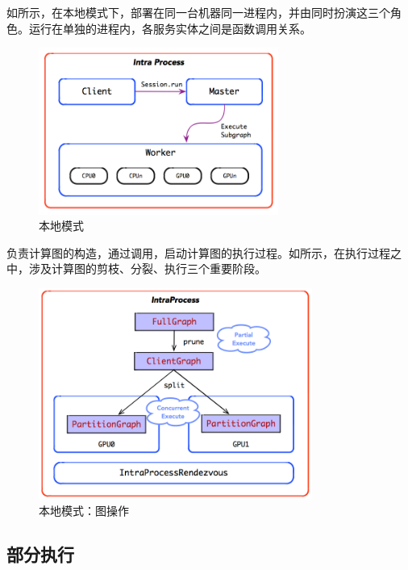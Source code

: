 \begin{content}

如所示，在本地模式下，部署在同一台机器同一进程内，并由同时扮演这三个角色。运行在单独的进程内，各服务实体之间是函数调用关系。

\begin{figure}[H]
\centering
\includegraphics[width=0.7\textwidth]{figures/local.png}
\caption{本地模式}
 \label{fig:local}
\end{figure}

负责计算图的构造，通过调用，启动计算图的执行过程。如所示，在执行过程之中，涉及计算图的剪枝、分裂、执行三个重要阶段。

\begin{figure}[H]
\centering
\includegraphics[width=0.8\textwidth]{figures/local-runtime.png}
\caption{本地模式：图操作}
 \label{fig:local-runtime}
\end{figure}

\subsection{部分执行}


\end{content}
